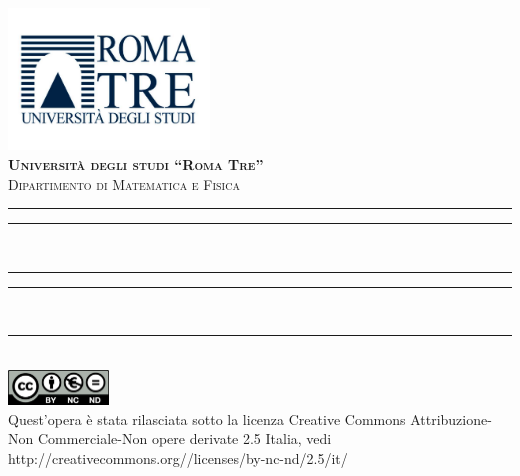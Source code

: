\begin{titlepage}
\setcounter{page}{3}
\begin{center}
\includegraphics[width=0.40\textwidth]{immagini/copertina/logo.pdf}~\\[1cm]

\textsc{\LARGE \bfseries Università degli studi  ``Roma Tre''}\\[0.4cm]

\textsc{\large Dipartimento di Matematica e Fisica}\\[1.5cm]


\hrule 
\vspace{0.1cm}
\hrule 
\vspace{0.4cm}
{ \Huge \bfseries \textsc{} \\[0.4cm] }
\hrule 
\vspace{0.1cm}
\hrule 
\vspace{0.5cm}
\hfill
\begin{minipage}[t]{0.47\textwidth}\raggedleft
{\Large{}}\\

\vspace{55mm}
\par
\noindent





\end{minipage}

\vspace{1mm}

\begin{center}
\hrule height 0.6mm
{\large{\textbf \quad}\\
\vspace{3mm}}
\includegraphics[width=0.20\textwidth]{immagini/copertina/cc.png}\\
\small{Quest'opera è stata rilasciata sotto la licenza Creative Commons Attribuzione-Non Commerciale-Non opere derivate 2.5 Italia, vedi http://creativecommons.org//licenses/by-nc-nd/2.5/it/}
\end{center}


\end{center}
\end{titlepage}
